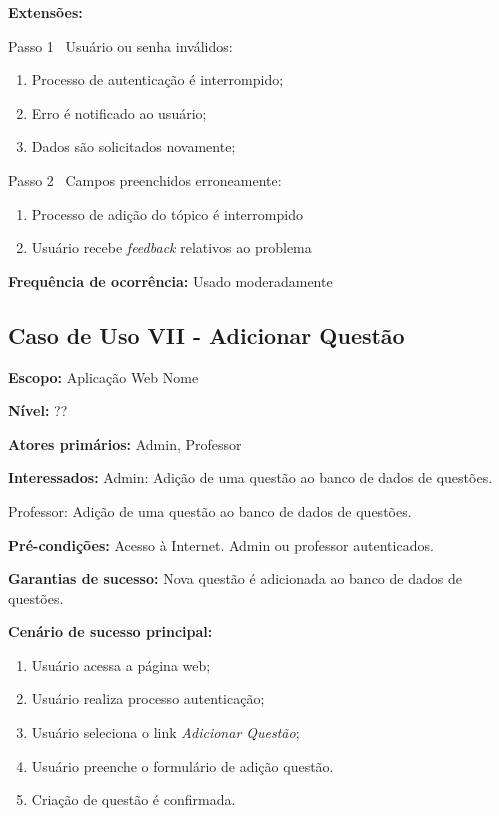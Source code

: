 \documentclass[12pt,oneside,a4paper,article]{abntex2}
\begin{document}
		\textbf{Extensões:} 
		
		Passo 1 \textrightarrow \ Usuário ou senha inválidos:
		
		\begin{enumerate}[label=\alph*.]	
			\item Processo de autenticação é interrompido;
			\item Erro é notificado ao usuário;
			\item Dados são solicitados novamente;
		\end{enumerate}
		
		Passo 2 \textrightarrow \ Campos preenchidos erroneamente:
		
		\begin{enumerate}[label=\alph*.]	
			\item Processo de adição do tópico é interrompido
			\item Usuário recebe \textit{feedback} relativos ao problema	
		\end{enumerate}
		
		\textbf{Frequência de ocorrência:} Usado moderadamente
	
		\subsection{Caso de Uso VII - Adicionar Questão}
		
		\textbf{Escopo:} Aplicação Web Nome
		
		\textbf{Nível:} ??
		
		\textbf{Atores primários:} Admin, Professor
		
		\textbf{Interessados:} Admin: Adição de uma questão ao banco de dados de questões.
		
		Professor: Adição de uma questão ao banco de dados de questões.
		
		\textbf{Pré-condições:} Acesso à Internet. Admin ou professor autenticados.
		
		\textbf{Garantias de sucesso:} Nova questão é adicionada ao banco de dados de questões.
		
		\textbf{Cenário de sucesso principal:} 
		
		\begin{enumerate}
			\item Usuário acessa a página web;
			
			\item Usuário realiza processo autenticação;
			
			\item Usuário seleciona o link \textit{Adicionar Questão};
			
			\item Usuário preenche o formulário de adição questão.	
			
			\item Criação de questão é confirmada.
			
		\end{enumerate}
		
\end{document}
